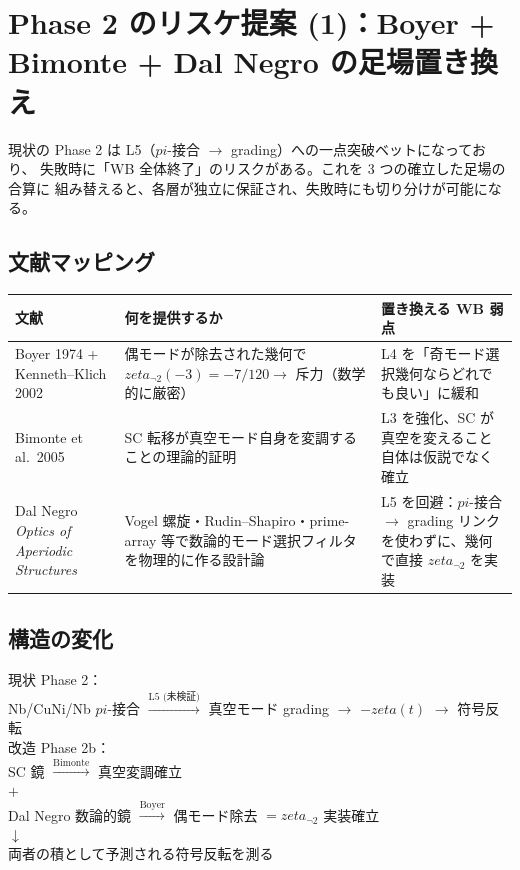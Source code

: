 \documentclass[11pt,a4paper]{article}
\def\pi{pi}%
\def\zeta{zeta}%
\def\textbf#1{#1}%
\begin{document}
\section{Phase 2 のリスケ提案 (1)：Boyer + Bimonte + Dal Negro の足場置き換え}

現状の Phase 2 は L5（$\pi$-接合 $\to$ grading）への一点突破ベットになっており、
失敗時に「WB 全体終了」のリスクがある。これを 3 つの確立した足場の合算に
組み替えると、各層が独立に保証され、失敗時にも切り分けが可能になる。

\subsection{文献マッピング}

\begin{center}
\begin{tabular}{lll}
\toprule
文献 & 何を提供するか & 置き換える WB 弱点 \\
\midrule
Boyer 1974 + Kenneth--Klich 2002 &
偶モードが除去された幾何で $\zeta_{\neg 2}(-3) = -7/120 \to$ 斥力（数学的に厳密） &
L4 を「奇モード選択幾何ならどれでも良い」に緩和 \\
\midrule
Bimonte et al.\ 2005 &
SC 転移が真空モード自身を変調することの理論的証明 &
L3 を強化、SC が真空を変えること自体は仮説でなく確立 \\
\midrule
Dal Negro \emph{Optics of Aperiodic Structures} &
Vogel 螺旋・Rudin--Shapiro・prime-array 等で数論的モード選択フィルタを物理的に作る設計論 &
L5 を回避：$\pi$-接合 $\to$ grading リンクを使わずに、幾何で直接 $\zeta_{\neg 2}$ を実装 \\
\bottomrule
\end{tabular}
\end{center}

\subsection{構造の変化}

\begin{center}
\begin{tcolorbox}[colback=blue!5,colframe=blue!50!black]
\textbf{現状 Phase 2}：\\
Nb/CuNi/Nb $\pi$-接合 $\xrightarrow{\text{L5 (未検証)}}$ 真空モード grading
$\to$ $-\zeta(t)$ $\to$ 符号反転\\[6pt]

\textbf{改造 Phase 2b}：\\
SC 鏡 $\xrightarrow{\text{Bimonte}}$ 真空変調確立\\
\hspace{1.5em}$+$\\
Dal Negro 数論的鏡 $\xrightarrow{\text{Boyer}}$ 偶モード除去 $=\zeta_{\neg 2}$ 実装確立\\
\hspace{1.5em}$\downarrow$\\
両者の積として予測される符号反転を測る
\end{tcolorbox}
\end{center}
\end{document}
